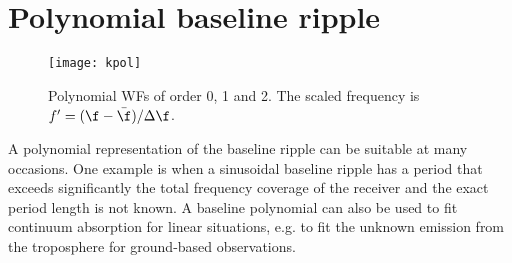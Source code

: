\section{Polynomial baseline ripple}
 \label{sec:measerr:pol}
 
 \begin{figure}
  \begin{center}
   \begin{minipage}[c]{0.62\textwidth}
    \centering
    \texttt{[image: kpol]}
   \end{minipage}%
   \hspace{0.03\textwidth}%
   \begin{minipage}[c]{0.35\textwidth}
    \centering
    \caption{Polynomial WFs of order 0, 1 and 2. The scaled frequency is 
             $f'=(\f-\bar{\f})/\Delta \f$.}
    \label{fig:measerr:kpol}
   \end{minipage}
  \end{center}
 \end{figure}           

 A polynomial representation of the baseline ripple can be suitable
 at many occasions. One example is when a sinusoidal baseline ripple 
 has a period that exceeds significantly the total frequency coverage
 of the receiver and the exact period length is not known. A baseline
 polynomial can also be used to fit continuum absorption for linear
 situations, e.g. to fit the unknown emission from the troposphere
 for ground-based observations.


